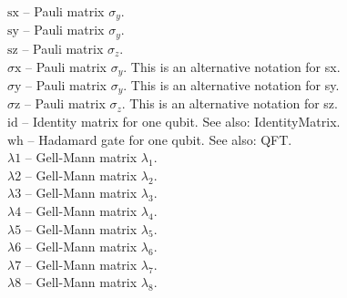 \noindent\textbf{$ \text{sx} $ }-- Pauli matrix $ \sigma _y. $\\[6pt]

\noindent\textbf{$ \text{sy} $ }-- Pauli matrix $ \sigma _y. $\\[6pt]

\noindent\textbf{$ \text{sz} $ }-- Pauli matrix $ \sigma _z. $\\[6pt]

\noindent\textbf{$ \text{$\sigma $x} $ }-- Pauli matrix $ \sigma _y $. This is an alternative notation for sx.$  $\\[6pt]

\noindent\textbf{$ \text{$\sigma $y} $ }-- Pauli matrix $ \sigma _y $. This is an alternative notation for sy.$  $\\[6pt]

\noindent\textbf{$ \text{$\sigma $z} $ }-- Pauli matrix $ \sigma _z $. This is an alternative notation for sz.$  $\\[6pt]

\noindent\textbf{$ \text{id} $ }-- Identity matrix for one qubit. See also: IdentityMatrix.$  $\\[6pt]

\noindent\textbf{$ \text{wh} $ }-- Hadamard gate for one qubit. See also: QFT.$  $\\[6pt]

\noindent\textbf{$ \text{$\lambda $1} $ }-- Gell-Mann matrix $ \lambda _1. $\\[6pt]

\noindent\textbf{$ \text{$\lambda $2} $ }-- Gell-Mann matrix $ \lambda _2. $\\[6pt]

\noindent\textbf{$ \text{$\lambda $3} $ }-- Gell-Mann matrix $ \lambda _3. $\\[6pt]

\noindent\textbf{$ \text{$\lambda $4} $ }-- Gell-Mann matrix $ \lambda _4. $\\[6pt]

\noindent\textbf{$ \text{$\lambda $5} $ }-- Gell-Mann matrix $ \lambda _5. $\\[6pt]

\noindent\textbf{$ \text{$\lambda $6} $ }-- Gell-Mann matrix $ \lambda _6. $\\[6pt]

\noindent\textbf{$ \text{$\lambda $7} $ }-- Gell-Mann matrix $ \lambda _7. $\\[6pt]

\noindent\textbf{$ \text{$\lambda $8} $ }-- Gell-Mann matrix $ \lambda _8. $\\[6pt]

